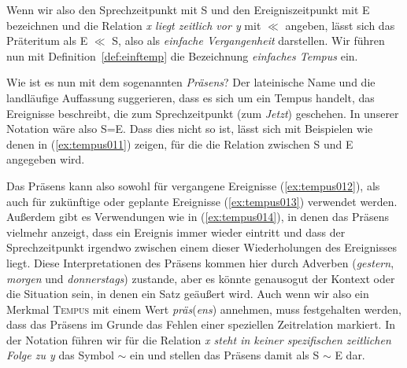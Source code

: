 
Wenn wir also den Sprechzeitpunkt mit S und den Ereigniszeitpunkt mit E bezeichnen und die Relation \textit{x liegt zeitlich vor y} mit $\ll$ angeben, lässt sich das Präteritum als E $\ll$ S, also als \textit{einfache Vergangenheit} darstellen.
Wir führen nun mit Definition~\ref{def:einftemp} die Bezeichnung \textit{einfaches Tempus} ein.


Wie ist es nun mit dem sogenannten \textit{Präsens}?
Der lateinische Name und die landläufige Auffassung suggerieren, dass es sich um ein Tempus handelt, das Ereignisse beschreibt, die zum Sprechzeitpunkt (zum \textit{Jetzt}) geschehen.
In unserer Notation wäre also S=E.
Dass dies nicht so ist, lässt sich mit Beispielen wie denen in (\ref{ex:tempus011}) zeigen, für die die Relation zwischen S und E angegeben wird.

\begin{exe}
  \ex\label{ex:tempus011}
  \begin{xlist}
  \end{xlist}
\end{exe}


Das Präsens kann also sowohl für vergangene Ereignisse (\ref{ex:tempus012}), als auch für zukünftige oder geplante Ereignisse (\ref{ex:tempus013}) verwendet werden.
Außerdem gibt es Verwendungen wie in (\ref{ex:tempus014}), in denen das Präsens vielmehr anzeigt, dass ein Ereignis immer wieder eintritt und dass der Sprechzeitpunkt irgendwo zwischen einem dieser Wiederholungen des Ereignisses liegt.
Diese Interpretationen des Präsens kommen hier durch Adverben (\textit{gestern}, \textit{morgen} und \textit{donnerstags}) zustande, aber es könnte genausogut der Kontext oder die Situation sein, in denen ein Satz geäußert wird.
Auch wenn wir also ein Merkmal \textsc{Tempus} mit einem Wert \textit{präs}(\textit{ens}) annehmen, muss festgehalten werden, dass das Präsens im Grunde das Fehlen einer speziellen Zeitrelation markiert.
In der Notation führen wir für die Relation \textit{x steht in keiner spezifischen zeitlichen Folge zu y} das Symbol $\sim$ ein und stellen das Präsens damit als S $\sim$ E dar.

